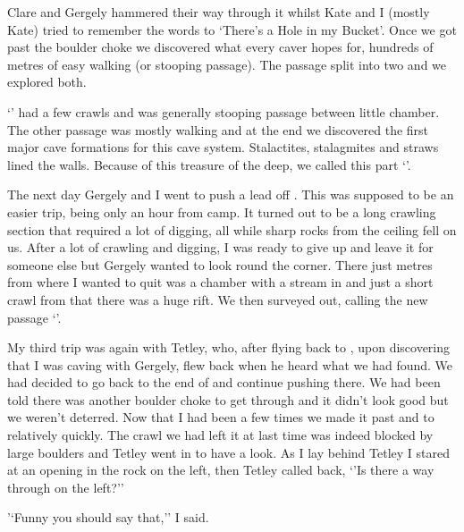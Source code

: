 Clare and Gergely hammered their way through it whilst Kate and I (mostly Kate) tried to remember the words to ‘There’s a Hole in my Bucket’. Once we got past the boulder choke we discovered what every caver hopes for, hundreds of metres of easy walking (or stooping passage). The passage split into two and we explored both.

‘’ had a few crawls and was generally stooping passage between little chamber. The other passage was mostly walking and at the end we discovered the first major cave formations for this cave system. Stalactites, stalagmites and straws lined the walls. Because of this treasure of the deep, we called this part ‘’.


The next day Gergely and I went to push a lead off . This was supposed to be an easier trip, being only an hour from camp. It turned out to be a long crawling section that required a lot of digging, all while sharp rocks from the ceiling fell on us. After a lot of crawling and digging, I was ready to give up and leave it for someone else but Gergely wanted to look round the corner. There just metres from where I wanted to quit was a chamber with a stream in and just a short crawl from that there was a huge rift. We then surveyed out, calling the new passage ‘’.

My third trip was again with Tetley, who, after flying back to , upon discovering that I was caving with Gergely, flew back when he heard what we had found. We had decided to go back to the end of  and continue pushing there. We had been told there was another boulder choke to get through and it didn’t look good but we weren’t deterred. Now that I had been a few times we made it past  and to  relatively quickly. The crawl we had left it at last time was indeed blocked by large boulders and Tetley went in to have a look. As I lay behind Tetley I stared at an opening in the rock on the left, then Tetley called back, ‘'Is there a way through on the left?’'

'‘Funny you should say that,'’ I said.

